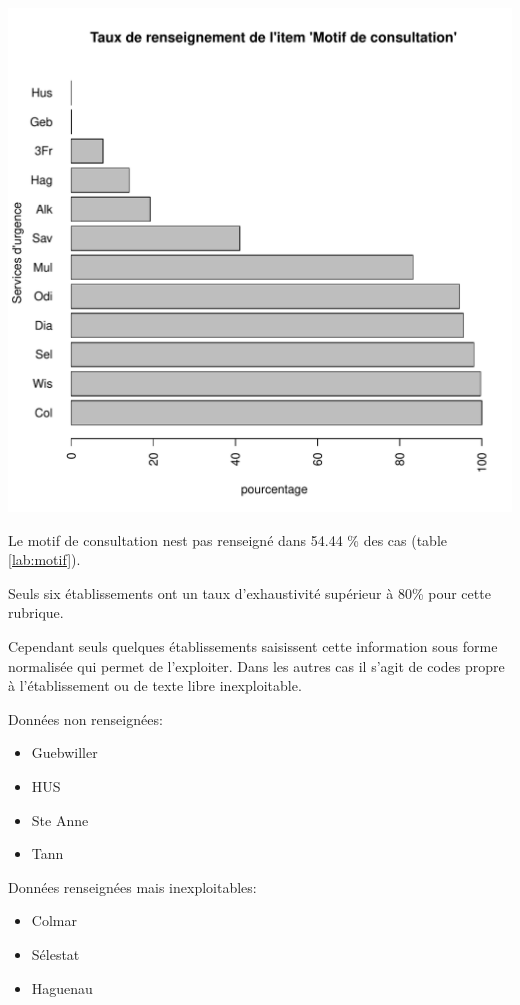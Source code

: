 \documentclass[12pt,english,french,twoside]{report}\usepackage[]{graphicx}\usepackage[]{color}
\makeatletter
\def\maxwidth{ %
  \ifdim\Gin@nat@width>\linewidth
    \linewidth
  \else
    \Gin@nat@width
  \fi
}
\makeatother
\begin{document}
\includegraphics[width=\maxwidth]{figure/motifss2} 



Le motif de consultation nest pas renseigné dans 54.44 \% des cas (table \ref{lab:motif}).

Seuls six établissements ont un taux d'exhaustivité supérieur à 80\% pour cette rubrique.

Cependant seuls quelques établissements saisissent cette information sous forme normalisée qui permet de l'exploiter. Dans les autres cas il s'agit de codes propre à l'établissement ou de texte libre inexploitable.

Données non renseignées:
\begin{itemize}
  \item Guebwiller
  \item HUS
  \item Ste Anne
  \item Tann
\end{itemize}

Données renseignées mais inexploitables:
\begin{itemize}
  \item Colmar
  \item Sélestat
  \item Haguenau
\end{itemize}
\end{document}
